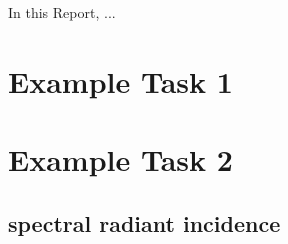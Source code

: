 
In this Report, ...


\section{Example Task 1}



\section{Example Task 2}

\subsection{spectral radiant incidence}
